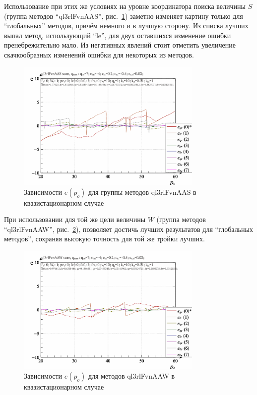 Использование при этих же условиях на уровне координатора поиска
величины $S$ (группа методов ``ql3rlFvnAAS'', рис.~\ref{atu:f:ql3rlFvnAAS_scan}) заметно
изменяет картину только для ``глобальных'' методов,
причём немного и в лучшую сторону.
Из списка лучших выпал метод, использующий ``le'',
для двух оставшихся изменение ошибки пренебрежительно мало.
Из негативных явлений стоит отметить увеличение скачкообразных
изменений ошибки для некоторых из методов.

\begin{figure}[htb!]
  \centerline{
    \includegraphics[width=0.8\textwidth]{p/scan/qls-p_p_e_ql3rlFvnAAS_scan.png}
  }
  \caption{Зависимости $e(p_o)$ для группы методов ql3rlFvnAAS в квазистационарном случае}
  \label{atu:f:ql3rlFvnAAS_scan}
\end{figure}

При использовании для той же цели величины $W$
(группа методов ``ql3rlFvnAAW'', рис.~\ref{atu:f:ql3rlFvnAAW_scan}),
позволяет достичь лучших результатов для ``глобальных методов'',
сохраняя высокую точность для той же тройки лучших.


\begin{figure}[htb!]
  \centerline{
    \includegraphics[width=0.8\textwidth]{p/scan/qls-p_p_e_ql3rlFvnAAW_scan.png}
  }
  \caption{Зависимости $e(p_o)$ для методов ql3rlFvnAAW в квазистационарном случае}
  \label{atu:f:ql3rlFvnAAW_scan}
\end{figure}

